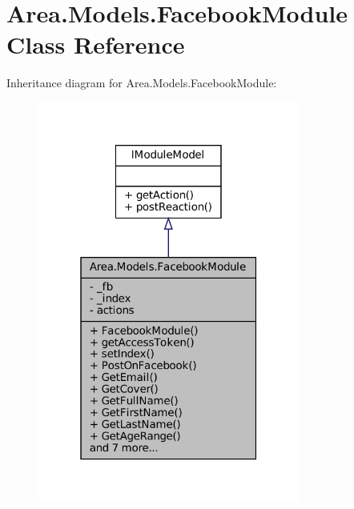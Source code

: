 \hypertarget{classArea_1_1Models_1_1FacebookModule}{}\section{Area.\+Models.\+Facebook\+Module Class Reference}
\label{classArea_1_1Models_1_1FacebookModule}


Inheritance diagram for Area.\+Models.\+Facebook\+Module\+:
\nopagebreak
\begin{figure}[H]
\begin{center}
\leavevmode
\includegraphics[width=244pt]{classArea_1_1Models_1_1FacebookModule__inherit__graph}
\end{center}
\end{figure}


